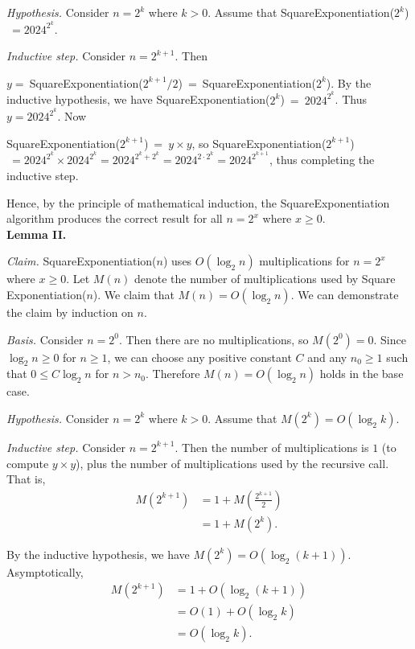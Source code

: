 \begin{enumerate}
\begin{solution}
\textit{Hypothesis. }Consider $n=2^k$ where $k>0$. Assume that {\sc SquareExponentiation}($2^k$)$~=2024^{2^k}$.

\textit{Inductive step. }Consider $n=2^{k+1}$. Then

$y=~${\sc SquareExponentiation}($2^{k+1}/2$)$~=~${\sc SquareExponentiation}($2^k$). By the inductive hypothesis, we have
{\sc SquareExponentiation}($2^k$)$~=~2024^{2^k}$. Thus $y=2024^{2^k}$. Now

{\sc SquareExponentiation}($2^{k+1}$)$~=~y\times y$, so {\sc SquareExponentiation}($2^{k+1}$)$~=2024^{2^k}\times 2024^{2^k}=2024^{2^k+2^k}=2024^{2\cdot 2^k}=2024^{2^{k+1}}$, thus completing the inductive step.

Hence, by the principle of mathematical induction, the {\sc SquareExponentiation} algorithm produces the correct result for all $n=2^x$ where $x\geq 0$.\\

\textbf{Lemma II. }

\textit{Claim. }{\sc SquareExponentiation}($n$) uses $O(\log_2n)$ multiplications for $n=2^x$ where $x\geq 0$. Let $M(n)$ denote the number of multiplications used by {\sc Square Exponentiation}($n$). We claim that $M(n)=O(\log_2n)$. We can demonstrate the claim by induction on $n$.

\textit{Basis. }Consider $n=2^0$. Then there are no multiplications, so $M(2^0)=0$. Since $\log_2n\geq 0$ for $n\geq 1$, we can choose any positive constant $C$ and any $n_0\geq 1$ such that $0\leq C\log_2n$ for $n>n_0$. Therefore $M(n)=O(\log_2n)$ holds in the base case.

\textit{Hypothesis. }Consider $n=2^k$ where $k>0$. Assume that $M(2^k)=O(\log_2k)$.

\textit{Inductive step. }Consider $n=2^{k+1}$. Then the number of multiplications is $1$ (to compute $y\times y$), plus the number of multiplications used by the recursive call. That is, 
\begin{align*}
M(2^{k+1})&=1+M\left(\frac{2^{k+1}}{2}\right)\\
&=1+M(2^k).
\end{align*}

By the inductive hypothesis, we have $M(2^k)=O(\log_2(k+1))$. Asymptotically,
\begin{align*}
M(2^{k+1})&=1+O(\log_2(k+1))\\
&=O(1)+O(\log_2k)\\
&=O(\log_2k).
\end{align*}


\end{solution}
\end{enumerate}
